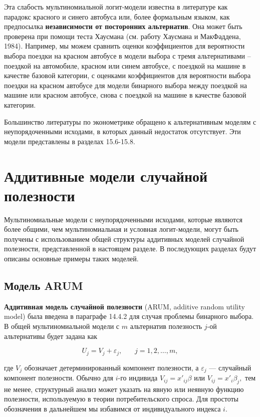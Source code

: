 Эта слабость мультиномиальной логит-модели известна в литературе как парадокс красного и синего автобуса или, более формальным языком, как предпосылка \textbf{независимости от посторонних альтернатив}. Она может быть проверена при помощи теста Хаусмана (см. работу Хаусмана и МакФаддена, 1984). Например, мы можем сравнить оценки коэффициентов для вероятности выбора поездки на красном автобусе в модели выбора с тремя альтернативами -- поездкой на автомобиле, красном или синем автобусе, с поездкой на машине в качестве базовой категории, с оценками коэффициентов для вероятности выбора поездки на красном автобусе для модели бинарного выбора между поездкой на машине или красном автобусе, снова с поездкой на машине в качестве базовой категории.

Большинство литературы по эконометрике обращено к альтернативным моделям с неупорядоченными исходами, в которых данный недостаток отсутствует. Эти модели представлены в разделах 15.6-15.8.

\section{Аддитивные модели случайной полезности}

Мультиномиальные модели с неупорядоченными исходами, которые являются более общими, чем мультиномиальная и условная логит-модели, могут быть получены с использованием общей структуры аддитивных моделей случайной полезности, представленной в настоящем разделе. В последующих разделах будут описаны основные примеры таких моделей.

\subsection{Модель ARUM}

\textbf{Аддитивная модель случайной полезности} (ARUM, additive random utility model) была введена в параграфе 14.4.2 для случая проблемы бинарного выбора. В общей мультиномиальной модели с $m$ альтернатив полезность $j$-ой альтернативы будет задана как

\begin{equation} \label{GrindEQ__15_22_} U_j=V_j+{\varepsilon }_j,\ \ \ \ \ \ \ \ j=1,2,\dots ,m, \end{equation} 

где $V_j$ обозначает детерминированный компонент полезности, а ${\varepsilon }_j$ --- случайный компонент полезности. Обычно для $i$-го индивида $V_{ij}=x'_{ij}\beta $ или $V_{ij}=x'_i{\beta }_j,$ тем не менее, структурный анализ может указать на явную или неявную функцию полезности, используемую в теории потребительского спроса. Для простоты обозначения в дальнейшем мы избавимся от индивидуального индекса $i$.

